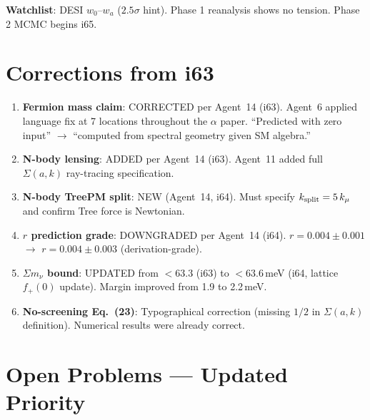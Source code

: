 \documentclass[11pt,a4paper]{article}
\begin{document}
\textbf{Watchlist}: DESI $w_0$--$w_a$ ($2.5\sigma$ hint). Phase 1 reanalysis shows no tension. Phase 2 MCMC begins i65.


\section{Corrections from i63}
\label{sec:corrections}

\begin{enumerate}
\item \textbf{Fermion mass claim}: CORRECTED per Agent~14 (i63). Agent~6 applied language fix at 7 locations throughout the $\alpha$ paper. ``Predicted with zero input'' $\to$ ``computed from spectral geometry given SM algebra.''

\item \textbf{N-body lensing}: ADDED per Agent~14 (i63). Agent~11 added full $\Sigma(a,k)$ ray-tracing specification.

\item \textbf{N-body TreePM split}: NEW (Agent~14, i64). Must specify $k_{\rm split} = 5\,k_\mu$ and confirm Tree force is Newtonian.

\item \textbf{$r$ prediction grade}: DOWNGRADED per Agent~14 (i64). $r = 0.004 \pm 0.001$ $\to$ $r = 0.004 \pm 0.003$ (derivation-grade).

\item \textbf{$\Sigma m_\nu$ bound}: UPDATED from $< 63.3$ (i63) to $< 63.6$\,meV (i64, lattice $f_+(0)$ update). Margin improved from 1.9 to 2.2\,meV.

\item \textbf{No-screening Eq.~(23)}: Typographical correction (missing $1/2$ in $\Sigma(a,k)$ definition). Numerical results were already correct.
\end{enumerate}


\section{Open Problems --- Updated Priority}
\label{sec:open}
\end{document}
